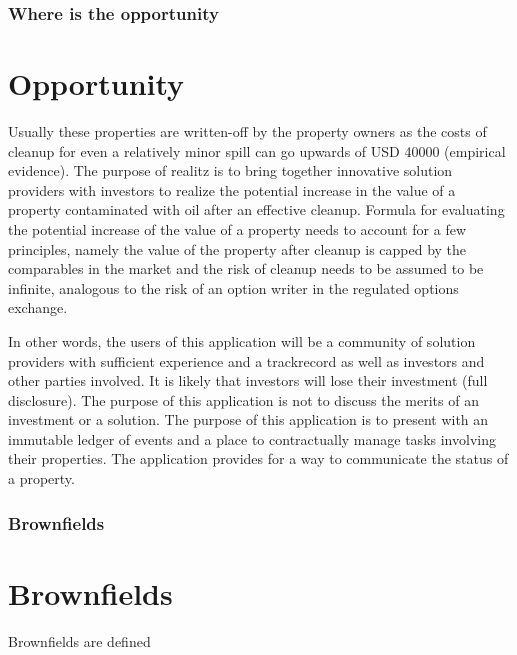 \documentclass{beamer}
\begin{document}
\begin{frame}
\frametitle{Where is the opportunity}
\section {Opportunity}
Usually these properties are written-off by the property owners as the costs of cleanup for even a relatively minor spill can go upwards of USD 40000 (empirical evidence). The purpose of realitz is to bring together innovative solution providers with investors to realize the potential increase in the value of a property contaminated with oil after an effective cleanup. Formula for evaluating the potential increase of the value of a property needs to account for a few principles, namely the value of the property after cleanup is capped by the comparables in the market and the risk of cleanup needs to be assumed to be infinite, analogous to the risk of an option writer in the regulated options exchange. 

In other words, the users of this application will be a community of solution providers with sufficient experience and a trackrecord as well as investors and other parties involved. It is likely that investors will lose their investment (full disclosure). The purpose of this application is not to discuss the merits of an investment or a solution. The purpose of this application is to present with an immutable ledger of events and a place to contractually manage tasks involving their properties. The application provides for a way to communicate the status of a property.



\end{frame}
\begin{frame}
\frametitle{Brownfields}
\section{Brownfields} \label{brownfields}
  Brownfields are defined 
\end{frame}
\end{document}
